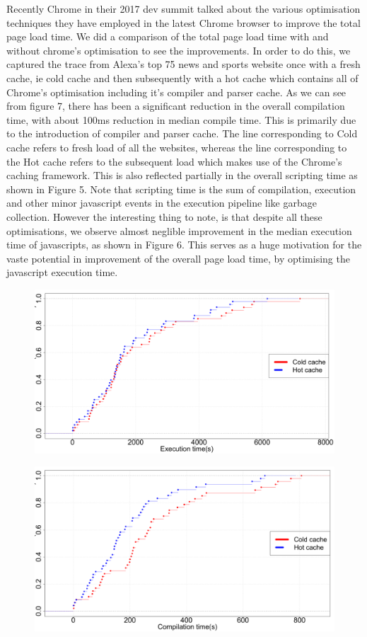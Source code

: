 Recently Chrome in their 2017 dev summit talked about the various optimisation techniques
they have employed in the latest Chrome browser to improve the total page load time.
We did a comparison of the total page load time with and without chrome's optimisation to see
the improvements. In order to do this, we captured the trace from Alexa's top 75 
news and sports website once with a fresh cache, ie cold cache and then subsequently with a hot
cache which contains all of Chrome's optimisation including it's compiler and parser cache. 
As we can see from figure 7, there has been a significant reduction in the overall compilation
time, with about 100ms reduction in median compile time. This is primarily due to the introduction of compiler and parser cache. 
The line corresponding to Cold cache refers to fresh load of all the websites,
whereas the line corresponding to the Hot cache refers to the subsequent load
which makes use of the Chrome's caching framework. 
This is also reflected partially in the overall scripting time
as shown in Figure 5. Note that scripting time is the sum of compilation, execution and other
minor javascript events in the execution pipeline like garbage collection. 
However the interesting thing to note, is that despite all these optimisations,
we observe almost neglible improvement in the median execution time of javascripts, as
shown in Figure 6. This serves as a huge motivation for the vaste potential in
improvement of the overall page load time, by optimising the javascript execution
time.

\begin{figure}[t]
\centering
\includegraphics[width=0.9\columnwidth]{figs/chrome_exec.png}
\label{fig:compile_p2}
\end{figure}

\begin{figure}[t]
\centering
\includegraphics[width=0.9\columnwidth]{figs/chrome_compile.png}
\label{fig:compile_p2}
\end{figure}

